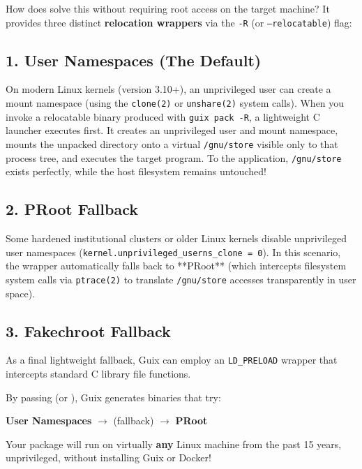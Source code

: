 How does  solve this without requiring root access on the target machine? It provides three distinct \textbf{relocation wrappers} via the \texttt{-R} (or \texttt{--relocatable}) flag:

\subsection{1. User Namespaces (The Default)}
On modern Linux kernels (version 3.10+), an unprivileged user can create a mount namespace (using the \texttt{clone(2)} or \texttt{unshare(2)} system calls). 
When you invoke a relocatable binary produced with \texttt{guix pack -R}, a lightweight C launcher executes first. It creates an unprivileged user and mount namespace, mounts the unpacked directory onto a virtual \texttt{/gnu/store} visible only to that process tree, and executes the target program. To the application, \texttt{/gnu/store} exists perfectly, while the host filesystem remains untouched!

\subsection{2. PRoot Fallback}
Some hardened institutional clusters or older Linux kernels disable unprivileged user namespaces (\texttt{kernel.unprivileged\_userns\_clone = 0}). In this scenario, the wrapper automatically falls back to **PRoot** (which intercepts filesystem system calls via \texttt{ptrace(2)} to translate \texttt{/gnu/store} accesses transparently in user space).

\subsection{3. Fakechroot Fallback}
As a final lightweight fallback, Guix can employ an \texttt{LD\_PRELOAD} wrapper that intercepts standard C library file functions.

\begin{alchemybox}
By passing  (or ), Guix generates binaries that try:
\begin{center}
\textbf{User Namespaces} $\longrightarrow$ (fallback) $\longrightarrow$ \textbf{PRoot}
\end{center}
Your package will run on virtually \textbf{any} Linux machine from the past 15 years, unprivileged, without installing Guix or Docker!
\end{alchemybox}


